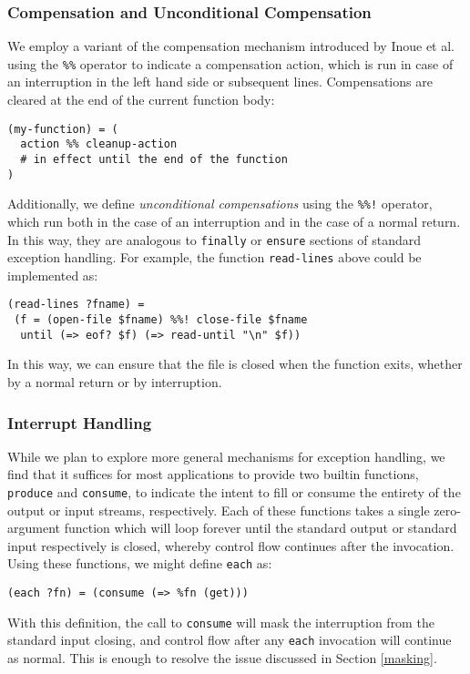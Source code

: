 \ifsigpro{ \documentclass[english,PRO]{ipsj} }
\begin{document}
\subsubsection{Compensation and Unconditional Compensation}\noindent
 We employ a variant of the compensation mechanism introduced by Inoue et al.\cite{compensation}
using the \verb/%%/ operator to indicate a compensation action, which is run in case of an interruption in the left hand side or subsequent lines. Compensations are cleared at the end of the current function body:
\begin{lstlisting}
(my-function) = (
  action %% cleanup-action
  # in effect until the end of the function
)
\end{lstlisting}

\noindent Additionally, we define \emph{unconditional compensations} using the \verb/%%!/ operator, which run both in the case of an interruption and in the case of a normal return. In this way, they are analogous to \verb/finally/ or \verb/ensure/ sections of standard exception handling.
For example, the function \verb/read-lines/ above could be implemented as:
\begin{lstlisting}
(read-lines ?fname) =
 (f = (open-file $fname) %%! close-file $fname
  until (=> eof? $f) (=> read-until "\n" $f))
\end{lstlisting}

\noindent
In this way, we can ensure that the file is closed when the function exits, whether by a normal return or by interruption.

\subsubsection{Interrupt Handling}\noindent
While we plan to explore more general mechanisms for exception handling, we find that it suffices for most applications to provide two builtin functions, \verb/produce/ and \verb/consume/, to indicate the intent to fill or consume the entirety of the output or input streams, respectively. Each of these functions takes a single zero-argument function which will loop forever until the standard output or standard input respectively is closed, whereby control flow continues after the invocation. Using these functions, we might define \verb/each/ as:
\begin{lstlisting}
(each ?fn) = (consume (=> %fn (get)))
\end{lstlisting}

\noindent
With this definition, the call to \verb/consume/ will mask the interruption from the standard input closing, and control flow after any \verb/each/ invocation will continue as normal. This is enough to resolve the issue discussed in Section \ref{masking}.
\end{document}
